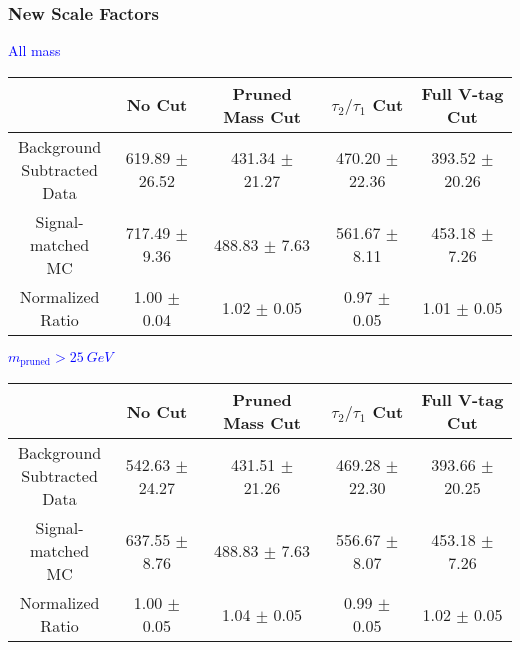 \documentclass{beamer}
\begin{document}
\begin{frame}
  \frametitle{New Scale Factors}
  \begin{adjustwidth}{-1.5em}{-1.5em}
    \centering
    \vspace{6pt}
    \textcolor{blue}{All mass}
    \vspace{6pt}

    {\scriptsize
      \begin{tabular}{c | c | c | c | c}
        \hline
        & No Cut & Pruned Mass Cut & $\tau_2/\tau_1$ Cut & Full V-tag Cut \\
        \hline
        \makecell{Background \\ Subtracted \\ Data} & 619.89 $\pm$ 26.52 & 431.34 $\pm$ 21.27 & 470.20 $\pm$ 22.36 & 393.52 $\pm$ 20.26 \\
        \makecell{Signal-\\ matched MC} & 717.49 $\pm$ 9.36 & 488.83 $\pm$ 7.63 & 561.67 $\pm$ 8.11 & 453.18 $\pm$ 7.26 \\
        \hline
        \makecell{Normalized \\ Ratio} & 1.00 $\pm$ 0.04 & 1.02 $\pm$ 0.05 & 0.97 $\pm$ 0.05 & 1.01 $\pm$ 0.05 \\
        \hline
    \end{tabular}
    }

    \vspace{6pt}
    \textcolor{blue}{$m_\text{pruned} > \SI{25}{GeV}$}
    \vspace{6pt}

    {\scriptsize
      \begin{tabular}{c | c | c | c | c}
        \hline
        & No Cut & Pruned Mass Cut & $\tau_2/\tau_1$ Cut & Full V-tag Cut \\
        \hline
        \makecell{Background \\ Subtracted \\ Data} & 542.63 $\pm$ 24.27 & 431.51 $\pm$ 21.26 & 469.28 $\pm$ 22.30 & 393.66 $\pm$ 20.25 \\
        \makecell{Signal-\\ matched MC} & 637.55 $\pm$ 8.76 & 488.83 $\pm$ 7.63 & 556.67 $\pm$ 8.07 & 453.18 $\pm$ 7.26 \\
        \hline
        \makecell{Normalized \\ Ratio} & 1.00 $\pm$ 0.05 & 1.04 $\pm$ 0.05 & 0.99 $\pm$ 0.05 & 1.02 $\pm$ 0.05 \\
        \hline
      \end{tabular}
    }
  \end{adjustwidth}
\end{frame}
\end{document}
